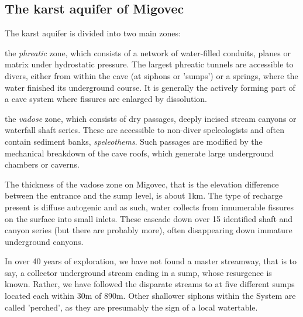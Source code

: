 \subsection{The karst aquifer of Migovec} 
The karst aquifer is divided into two main zones: \begin{citemize} 
\item the \emph{phreatic} zone, which consists of a network of water-filled conduits, planes or matrix under hydrostatic pressure. The largest phreatic tunnels are accessible to divers, either from within the cave (at siphons or 'sumps') or a springs, where the water finished its underground course. It is generally the actively forming part of a cave system where fissures are enlarged by dissolution.
\item the \emph{vadose} zone, which consists of dry passages, deeply incised stream canyons or waterfall shaft series. These are accessible to non-diver speleologists and often contain sediment banks, \emph{speleothems}. Such passages are modified by the mechanical breakdown of the cave roofs, which generate large underground chambers or caverns.
\end{citemize}

The thickness of the vadose zone on Migovec, that is the elevation difference between the entrance and the sump level, is about 1km. The type of recharge present is diffuse autogenic and as such, water collects from innumerable fissures on the surface into small inlets. These cascade down over 15 identified shaft and canyon series (but there are probably more), often disappearing down immature underground canyons. 

In over 40 years of exploration, we have not found a master streamway, that is to say, a collector underground stream ending in a sump, whose resurgence is known. Rather, we have followed the disparate streams to at five different sumps located each within 30m of 890m. Other shallower siphons within the System are called 'perched', as they are presumably the sign of a local watertable.

